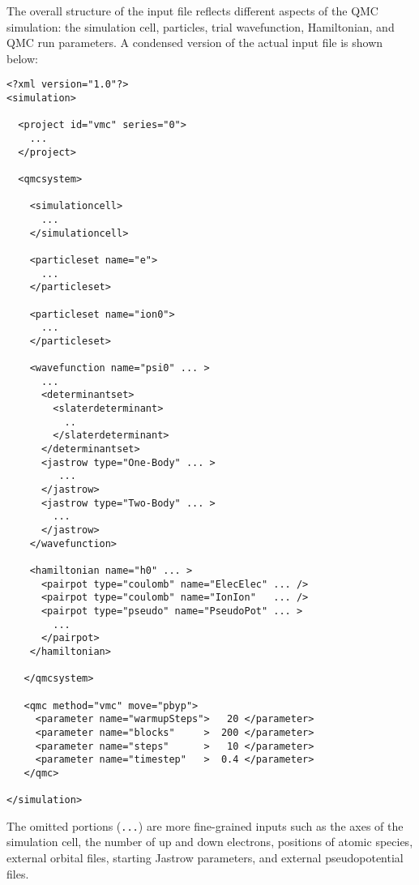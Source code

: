 The overall structure of the input file reflects different aspects of the QMC simulation: the simulation cell, particles, trial wavefunction, Hamiltonian, and QMC run parameters.  A condensed version of the actual input file is shown below:
\begin{shaded}
\begin{verbatim}
<?xml version="1.0"?>
<simulation>

  <project id="vmc" series="0">
    ...
  </project>

  <qmcsystem>

    <simulationcell>
      ...
    </simulationcell>

    <particleset name="e">
      ...
    </particleset>

    <particleset name="ion0">
      ...
    </particleset>

    <wavefunction name="psi0" ... >
      ...
      <determinantset>
        <slaterdeterminant>
          ..
        </slaterdeterminant>
      </determinantset>
      <jastrow type="One-Body" ... >
         ...
      </jastrow>
      <jastrow type="Two-Body" ... >
        ...
      </jastrow>
    </wavefunction>

    <hamiltonian name="h0" ... >
      <pairpot type="coulomb" name="ElecElec" ... />
      <pairpot type="coulomb" name="IonIon"   ... />
      <pairpot type="pseudo" name="PseudoPot" ... >
        ...
      </pairpot>
    </hamiltonian>

   </qmcsystem>

   <qmc method="vmc" move="pbyp">
     <parameter name="warmupSteps">   20 </parameter>
     <parameter name="blocks"     >  200 </parameter>
     <parameter name="steps"      >   10 </parameter>
     <parameter name="timestep"   >  0.4 </parameter>
   </qmc>

</simulation>
\end{verbatim}
\end{shaded}
The omitted portions (\texttt{...}) are more fine-grained inputs such as the axes of the simulation cell, the number of up and down electrons, positions of atomic species, external orbital files, starting Jastrow parameters, and external pseudopotential files.  
